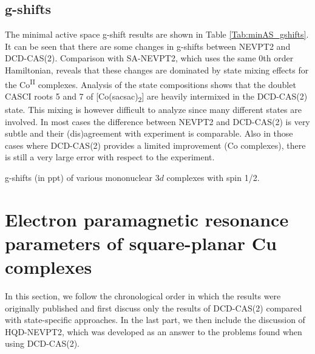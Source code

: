 \subsection{g-shifts}
The minimal active space g-shift results are shown in Table \ref{Tab:minAS_gshifts}. It can be seen that there are some changes in g-shifts between NEVPT2 and DCD-CAS(2). Comparison with SA-NEVPT2, which uses the same 0th order Hamiltonian, reveals that these changes are dominated by state mixing effects for the Co\textsuperscript{II} complexes. Analysis of the state compositions shows that the doublet CASCI roots 5 and 7 of [Co(sacsac)\textsubscript{2}] are heavily intermixed in the DCD-CAS(2) state. This mixing is however difficult to analyze since many different states are involved.
In most cases the difference between NEVPT2 and DCD-CAS(2) is very subtle and their (dis)agreement with experiment is comparable. Also in those cases where DCD-CAS(2) provides a limited improvement (Co complexes), there is still a very large error with respect to the experiment.
\begin{table}
\centering
\small
\ttabbox
{\caption[g-shifts of various mononuclear $3d$ complexes with spin 1/2.]{g-shifts (in ppt) of various mononuclear $3d$ complexes with spin 1/2.}
\label{Tab:minAS_gshifts}}
{}
\end{table}

\section{Electron paramagnetic resonance parameters of square-planar Cu complexes}
\label{Sec:Results_EPR}
In this section, we follow the chronological order in which the results were originally published and first discuss only the results of DCD-CAS(2) compared with state-specific approaches. In the last part, we then include the discussion of HQD-NEVPT2, which was developed as an answer to the problems found when using DCD-CAS(2).
\label{Sec:EPRsquareplanarCu}
